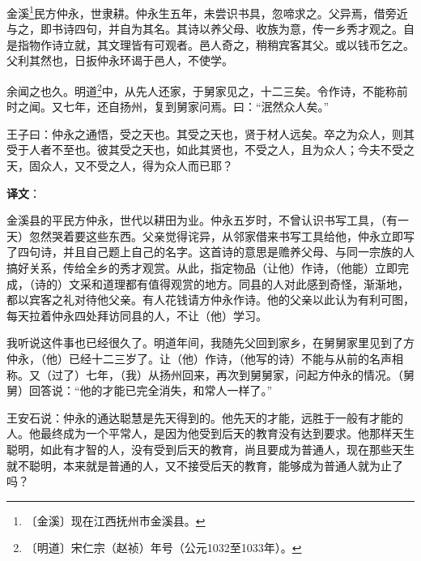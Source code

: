 \documentclass[12pt,UTF-8,openany]{ctexbook}
\begin{document}
\begin{normalsize}
    
    金溪\footnote{〔金溪〕现在江西抚州市金溪县。}民方仲永，世隶耕。仲永生五年，未尝识书具，忽啼求之。父异焉，借旁近与之，即书诗四句，并自为其名。其诗以养父母、收族为意，传一乡秀才观之。自是指物作诗立就，其文理皆有可观者。邑人奇之，稍稍宾客其父。或以钱币乞之。父利其然也，日扳仲永环谒于邑人，不使学。
    
    余闻之也久。明道\footnote{〔明道〕宋仁宗（赵祯）年号（公元1032至1033年）。}中，从先人还家，于舅家见之，十二三矣。令作诗，不能称前时之闻。又七年，还自扬州，复到舅家问焉。曰：“泯然众人矣。”
    
    王子曰：仲永之通悟，受之天也。其受之天也，贤于材人远矣。卒之为众人，则其受于人者不至也。彼其受之天也，如此其贤也，不受之人，且为众人；今夫不受之天，固众人，又不受之人，得为众人而已耶？
\end{normalsize}


\newpage

\textbf{译文}：

\vspace{1em}

\begin{normalsize}
    
    金溪县的平民方仲永，世代以耕田为业。仲永五岁时，不曾认识书写工具，（有一天）忽然哭着要这些东西。父亲觉得诧异，从邻家借来书写工具给他，仲永立即写了四句诗，并且自己题上自己的名字。这首诗的意思是赡养父母、与同一宗族的人搞好关系，传给全乡的秀才观赏。从此，指定物品（让他）作诗，（他能）立即完成，（诗的）文采和道理都有值得观赏的地方。同县的人对此感到奇怪，渐渐地，都以宾客之礼对待他父亲。有人花钱请方仲永作诗。他的父亲以此认为有利可图，每天拉着仲永四处拜访同县的人，不让（他）学习。
    
    我听说这件事也已经很久了。明道年间，我随先父回到家乡，在舅舅家里见到了方仲永，（他）已经十二三岁了。让（他）作诗，（他写的诗）不能与从前的名声相称。又（过了）七年，（我）从扬州回来，再次到舅舅家，问起方仲永的情况。（舅舅）回答说：“他的才能已完全消失，和常人一样了。”
    
    王安石说：仲永的通达聪慧是先天得到的。他先天的才能，远胜于一般有才能的人。他最终成为一个平常人，是因为他受到后天的教育没有达到要求。他那样天生聪明，如此有才智的人，没有受到后天的教育，尚且要成为普通人，现在那些天生就不聪明，本来就是普通的人，又不接受后天的教育，能够成为普通人就为止了吗？
    
\end{normalsize}
\end{document}
